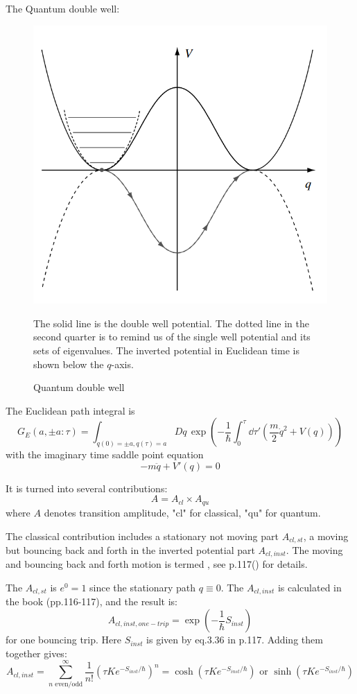 \documentclass{article}
\begin{document}
The Quantum double well:
\begin{figure}[H]
    \centering
    \includegraphics[width=0.6\linewidth]{pics/quantum-double-well.png}
    \caption{Quantum double well}
    The solid line is the double well potential. The dotted line in
    the second quarter is to remind us of the single well potential and its sets
    of eigenvalues. The inverted potential in Euclidean time is shown below the
    $q$-axis.
\end{figure}
The Euclidean path integral is
\begin{equation}
    G_E(a,\pm a:\tau)=\int_{q(0)=\pm a,q(\tau)=a} Dq\,
    \exp(-\frac{1}{\hbar}\int_0^\tau\dd{\tau'}
        \left(\frac{m}{2}\dot{q}^2+V(q)\right)
    )
\end{equation}
with the imaginary time saddle point equation
\begin{equation}
    -m\ddot{q}+V'(q) = 0
\end{equation}

It is turned into several contributions:
\begin{equation}
    A = A_{cl}\times A_{qu}
\end{equation}
where $A$ denotes transition amplitude, "cl" for classical, "qu" for quantum.

The classical contribution includes a stationary not moving part $A_{cl,st}$, a
moving but bouncing back and forth in the inverted potential part $A_{cl,inst}$.
The moving and bouncing back and forth motion is termed , see
p.117(\cite{Altland2010}) for details.

The $A_{cl,st}$ is $e^{0}=1$ since the stationary path $q\equiv0$. The
$A_{cl,inst}$ is calculated in the book (pp.116-117), and the result is:
\begin{equation}
    A_{cl,inst,one-trip} = \exp(-\frac{1}{\hbar}S_{inst})
\end{equation}
for one bouncing trip. Here $S_{inst}$ is given by eq.3.36 in p.117. Adding them
together gives:
\begin{equation}
    A_{cl,inst} =
    \sum_{n\text{ even/odd}}^\infty \frac{1}{n!}
    \left(\tau K e^{-S_{inst}/\hbar}\right)^n
    =\cosh(\tau Ke^{-S_{inst}/\hbar})\text{ or }\sinh(\tau Ke^{-S_{inst}/\hbar})
\end{equation}
\end{document}
